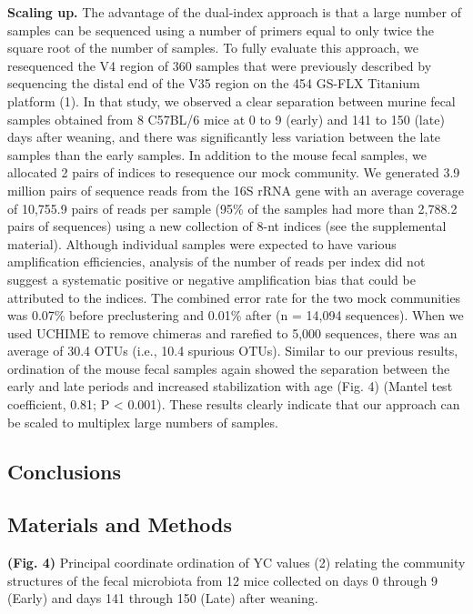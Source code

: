 \documentclass[11pt,]{article}
\begin{document}
\textbf{Scaling up.} The advantage of the dual-index approach is that a
large number of samples can be sequenced using a number of primers equal
to only twice the square root of the number of samples. To fully
evaluate this approach, we resequenced the V4 region of 360 samples that
were previously described by sequencing the distal end of the V35 region
on the 454 GS-FLX Titanium platform (1). In that study, we observed a
clear separation between murine fecal samples obtained from 8 C57BL/6
mice at 0 to 9 (early) and 141 to 150 (late) days after weaning, and
there was significantly less variation between the late samples than the
early samples. In addition to the mouse fecal samples, we allocated 2
pairs of indices to resequence our mock community. We generated 3.9
million pairs of sequence reads from the 16S rRNA gene with an average
coverage of 10,755.9 pairs of reads per sample (95\% of the samples had
more than 2,788.2 pairs of sequences) using a new collection of 8-nt
indices (see the supplemental material). Although individual samples
were expected to have various amplification efficiencies, analysis of
the number of reads per index did not suggest a systematic positive or
negative amplification bias that could be attributed to the indices. The
combined error rate for the two mock communities was 0.07\% before
preclustering and 0.01\% after (n = 14,094 sequences). When we used
UCHIME to remove chimeras and rarefied to 5,000 sequences, there was an
average of 30.4 OTUs (i.e., 10.4 spurious OTUs). Similar to our previous
results, ordination of the mouse fecal samples again showed the
separation between the early and late periods and increased
stabilization with age (Fig. 4) (Mantel test coefficient, 0.81; P
\textless{} 0.001). These results clearly indicate that our approach can
be scaled to multiplex large numbers of samples.

\subsection{Conclusions}\label{conclusions}

\subsection{Materials and Methods}\label{materials-and-methods}

\newpage

\textbf{(Fig. 4)} Principal coordinate ordination of YC values (2)
relating the community structures of the fecal microbiota from 12 mice
collected on days 0 through 9 (Early) and days 141 through 150 (Late)
after weaning.
\end{document}
